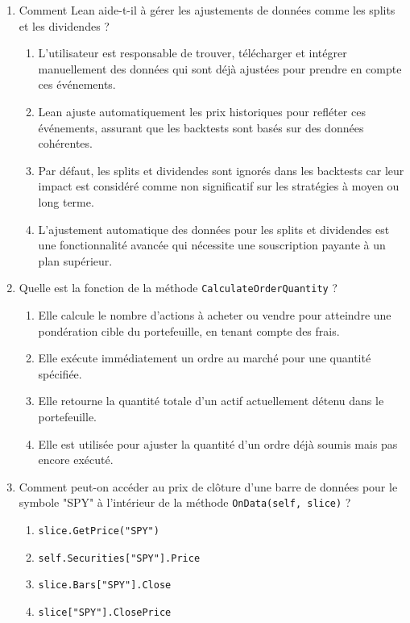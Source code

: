 \documentclass[a4paper,12pt]{article}
\begin{document}
\begin{enumerate}
    \item Comment Lean aide-t-il à gérer les ajustements de données comme les splits et les dividendes ?
    \begin{enumerate}[label=(\Alph*)]
        \item L'utilisateur est responsable de trouver, télécharger et intégrer manuellement des données qui sont déjà ajustées pour prendre en compte ces événements.
        \item Lean ajuste automatiquement les prix historiques pour refléter ces événements, assurant que les backtests sont basés sur des données cohérentes.
        \item Par défaut, les splits et dividendes sont ignorés dans les backtests car leur impact est considéré comme non significatif sur les stratégies à moyen ou long terme.
        \item L'ajustement automatique des données pour les splits et dividendes est une fonctionnalité avancée qui nécessite une souscription payante à un plan supérieur.
    \end{enumerate}
    
    \item Quelle est la fonction de la méthode \texttt{CalculateOrderQuantity} ?
    \begin{enumerate}[label=(\Alph*)]
        \item Elle calcule le nombre d'actions à acheter ou vendre pour atteindre une pondération cible du portefeuille, en tenant compte des frais.
        \item Elle exécute immédiatement un ordre au marché pour une quantité spécifiée.
        \item Elle retourne la quantité totale d'un actif actuellement détenu dans le portefeuille.
        \item Elle est utilisée pour ajuster la quantité d'un ordre déjà soumis mais pas encore exécuté.
    \end{enumerate}

    \item Comment peut-on accéder au prix de clôture d'une barre de données pour le symbole "SPY" à l'intérieur de la méthode \texttt{OnData(self, slice)} ?
    \begin{enumerate}[label=(\Alph*)]
        \item \texttt{slice.GetPrice("SPY")}
        \item \texttt{self.Securities["SPY"].Price}
        \item \texttt{slice.Bars["SPY"].Close}
        \item \texttt{slice["SPY"].ClosePrice}
    \end{enumerate}


\end{enumerate}
\end{document}
